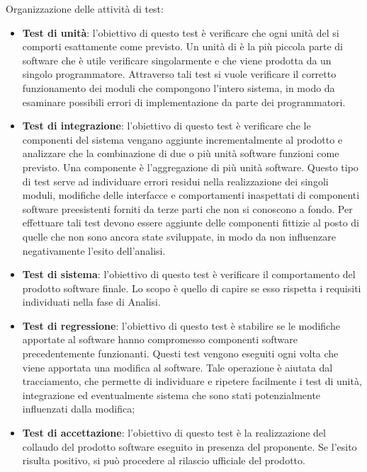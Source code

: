     Organizzazione delle attività di test:
    \begin{itemize}
      \item \textbf{Test di unità}: l'obiettivo di questo test è verificare che ogni unità del  si comporti esattamente come previsto. Un unità di  è la più piccola parte di software che è utile verificare singolarmente e che viene prodotta da un singolo programmatore. Attraverso tali test si vuole verificare il corretto funzionamento dei moduli che compongono l'intero sistema, in modo da esaminare possibili errori di implementazione da parte dei programmatori.

      \item \textbf{Test di integrazione}: l'obiettivo di questo test è verificare che le componenti del sistema vengano aggiunte incrementalmente al prodotto e analizzare che la combinazione di due o più unità software funzioni come previsto. Una componente è l'aggregazione di più unità software.
Questo tipo di test serve ad individuare errori residui nella realizzazione dei singoli moduli, modifiche delle interfacce e comportamenti inaspettati di componenti software preesistenti forniti da terze parti che non si conoscono a fondo.
Per effettuare tali test devono essere aggiunte delle componenti fittizie al posto di quelle che non sono ancora state sviluppate, in modo da non influenzare negativamente l'esito dell'analisi.

      \item \textbf{Test di sistema}: l'obiettivo di questo test è verificare il comportamento del prodotto software finale. Lo scopo è quello di capire se esso rispetta i requisiti individuati nella fase di Analisi.

      \item \textbf{Test di regressione}: l'obiettivo di questo test è stabilire se le modifiche apportate al software hanno compromesso componenti software precedentemente funzionanti.
      Questi test vengono eseguiti ogni volta che viene apportata una modifica al software.
      Tale operazione è aiutata dal tracciamento, che permette di individuare e ripetere facilmente i test di unità, integrazione ed eventualmente sistema che sono stati potenzialmente influenzati dalla modifica;
      \item \textbf{Test di accettazione}: l'obiettivo di questo test è la realizzazione del collaudo del prodotto software eseguito in presenza del proponente. Se l'esito risulta positivo, si può procedere al rilascio ufficiale del prodotto.
    \end{itemize}

